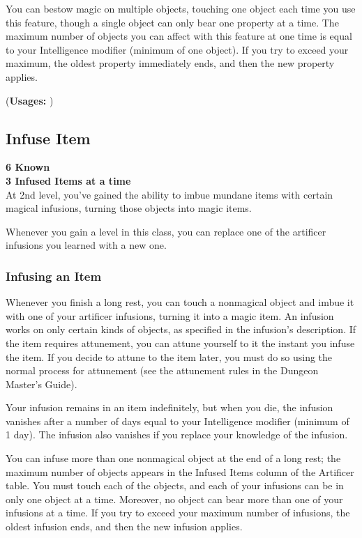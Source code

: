 {You can bestow magic on multiple objects, touching one object each time you use this feature, though a single object can only bear one property at a time. The maximum number of objects you can affect with this feature at one time is equal to your Intelligence modifier (minimum of one object). If you try to exceed your maximum, the oldest property immediately ends, and then the new property applies.

(\textbf{Usages: })
\subsection*{Infuse Item}
\textbf{6 Known}\\
\textbf{3 Infused Items at a time}\\
At 2nd level, you've gained the ability to imbue mundane items with certain magical infusions, turning those objects into magic items.

Whenever you gain a level in this class, you can replace one of the artificer infusions you learned with a new one.
\subsubsection*{Infusing an Item}
Whenever you finish a long rest, you can touch a nonmagical object and imbue it with one of your artificer infusions, turning it into a magic item. An infusion works on only certain kinds of objects, as specified in the infusion's description. If the item requires attunement, you can attune yourself to it the instant you infuse the item. If you decide to attune to the item later, you must do so using the normal process for attunement (see the attunement rules in the Dungeon Master's Guide).

Your infusion remains in an item indefinitely, but when you die, the infusion vanishes after a number of days equal to your Intelligence modifier (minimum of 1 day). The infusion also vanishes if you replace your knowledge of the infusion.

You can infuse more than one nonmagical object at the end of a long rest; the maximum number of objects appears in the Infused Items column of the Artificer table. You must touch each of the objects, and each of your infusions can be in only one object at a time. Moreover, no object can bear more than one of your infusions at a time. If you try to exceed your maximum number of infusions, the oldest infusion ends, and then the new infusion applies.

}
